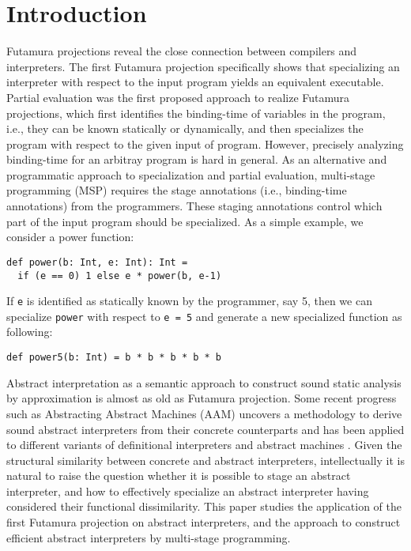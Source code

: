 \section{Introduction}


Futamura projections \cite{Futamura1999, futamura1971partial} reveal the close connection between 
compilers and interpreters. 
The first Futamura projection specifically shows that specializing an interpreter with respect to the input 
program yields an equivalent executable.
Partial evaluation \cite{DBLP:books/daglib/0072559} was the first proposed approach to realize Futamura projections,
which first identifies the binding-time of variables in the program, i.e., they can be known statically or dynamically, 
and then specializes the program with respect to the given input of program.
However, precisely analyzing binding-time for an arbitray program is hard in general. As an alternative and programmatic
approach to specialization and partial evaluation, multi-stage programming (MSP) \cite{taha1999multi, DBLP:conf/pepm/TahaS97} 
requires the stage annotations (i.e., binding-time annotations) from the programmers. These staging annotations 
control which part of the input program should be specialized.
As a simple example, we consider a power function: 
\begin{lstlisting}
def power(b: Int, e: Int): Int = 
  if (e == 0) 1 else e * power(b, e-1)
\end{lstlisting}
If \texttt{e} is identified as statically known by the programmer, say 5, then we can specialize \texttt{power} 
with respect to \texttt{e = 5} and generate a new specialized function as following:
\begin{lstlisting}
def power5(b: Int) = b * b * b * b * b
\end{lstlisting}

Abstract interpretation \cite{DBLP:conf/popl/CousotC77} as a semantic approach to construct sound static analysis 
by approximation is almost as old as Futamura projection.
Some recent progress such as Abstracting Abstract Machines (AAM) uncovers a methodology to derive sound abstract interpreters 
from their concrete counterparts and has been applied to different variants of definitional interpreters and abstract machines
\cite{DBLP:journals/jfp/HornM12, DBLP:conf/icfp/HornM10, DBLP:journals/pacmpl/DaraisLNH17}.
Given the structural similarity between concrete and abstract interpreters, intellectually 
it is natural to raise the question whether it is possible to stage an abstract interpreter, and how 
to effectively specialize an abstract interpreter having considered their functional dissimilarity. 
This paper studies the application of the first Futamura projection on abstract interpreters, 
and the approach to construct efficient abstract interpreters by multi-stage programming.

